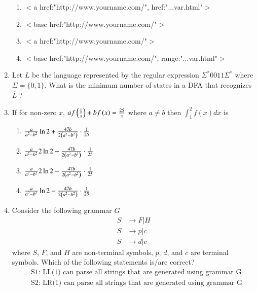 \documentclass[journal,12pt,onecolumn]{IEEEtran}
\theoremstyle{remark}
\begin{document}
\begin{enumerate}
		\begin{enumerate}
			\item $<$a href:"http://www.yourname.com/", href:"...var.html"$>$
			\item $<$base href:"http://www.yourname.com/"$>$
			\item $<$a href:"http://www.yourname.com/"$>$
			\item $<$base href:"http://www.yourname.com/", range:"...var.html"$>$
		\end{enumerate}
		
		\item Let $L$ be the language represented by the regular expression $\Sigma^*0011\Sigma^*$ where $\Sigma = \{0,1\}$. What is the minimum number of states in a DFA that recognizes $\overline{L}$ ?
		
		\hfill{}
		
		\begin{enumerate}
		\end{enumerate}
		
		\item If for non-zero $x$, $af\left(\frac{1}{x}\right) + bf\left(x\right) = \frac{25}{x}$ where $a \neq b$ then $\int_1^2 f(x)dx$ is
		
		\hfill{\brak{\text{GATE CS 2015}}}
		
		\begin{enumerate}
			\item $\frac{a}{a^2 - b^2} \ln 2 + \frac{47b}{2\left(a^2 - b^2\right)} \cdot \frac{1}{25}$
			\item $\frac{a}{a^2 - b^2} 2\ln 2 + \frac{47b}{2\left(a^2 - b^2\right)} \cdot \frac{1}{25}$
			\item $\frac{a}{a^2 - b^2} 2\ln 2 - \frac{47b}{2\left(a^2 - b^2\right)} \cdot \frac{1}{25}$
			\item $\frac{a}{a^2 - b^2} \ln 2 - \frac{47b}{2\left(a^2 - b^2\right)} \cdot \frac{1}{25}$
		\end{enumerate}
		
		\item Consider the following grammar $G$
		\begin{align*}
			S &\rightarrow F | H\\
			S &\rightarrow p | c\\
			S &\rightarrow d | c
		\end{align*}
		where $S$, $F$, and $H$ are non-terminal symbols, $p$, $d$, and $c$ are terminal symbols. Which of the following statements is/are correct?
		\begin{align*}
			&\text{S1: LL(1) can parse all strings that are generated using grammar G}\\
			&\text{S2: LR(1) can parse all strings that are generated using grammar G}
		\end{align*}
		

\end{enumerate}
\end{document}
